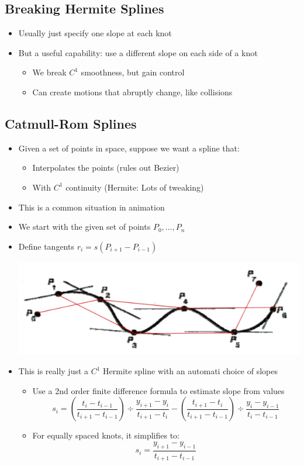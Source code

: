 \documentclass{article}
\begin{document}
\subsection*{Breaking Hermite Splines}
\begin{itemize}
    \item Usually just specify one slope at each knot
    \item But a useful capability: use a different slope on each side of a knot
    \begin{itemize}
        \item We break $C^1$ smoothness, but gain control
        \item Can create motions that abruptly change, like collisions
    \end{itemize}
\end{itemize}

\subsection*{Catmull-Rom Splines}
\begin{itemize}
    \item Given a set of points in space, suppose we want a spline that:
    \begin{itemize}
        \item Interpolates the points (rules out Bezier)
        \item With $C^1$ continuity (Hermite: Lots of tweaking)
    \end{itemize}
    \item This is a common situation in animation
    \item We start with the given set of points $P_0, \dots, P_n$
    \item Define tangents $r_i = s(P_{i + 1} - P_{i - 1})$
    \begin{center}
        \includegraphics*[scale=0.5]{W3_11.png}
    \end{center}
    \item This is really just a $C^1$ Hermite spline with an automati choice of slopes
    \begin{itemize}
        \item Use a 2nd order finite difference formula to estimate slope from values
        \[s_i = \left(\frac{t_i - t_{i - 1}}{t_{i + 1} - t_{i - 1}}\right) \div \frac{y_{i + 1} - y_i}{t_{i + 1} - t_i} - \left(\frac{t_{i + 1} - t_i}{t_{i + 1} - t_{i - 1}}\right) \div \frac{y_i - y_{i - 1}}{t_i - t_{i - 1}}\]
        \item For equally spaced knots, it simplifies to:
        \[s_i = \frac{y_{i + 1} - y_{i - 1}}{t_{i + 1} - t_{i - 1}}\]
    \end{itemize}
\end{itemize}
\end{document}
